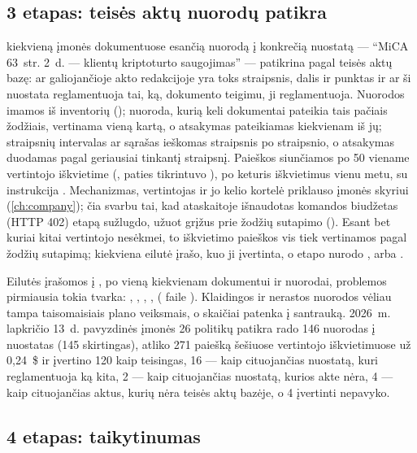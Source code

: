 \subsection{3 etapas: teisės aktų nuorodų patikra}

 kiekvieną įmonės dokumentuose esančią nuorodą į konkrečią nuostatą ---
\enquote{MiCA 63~str. 2~d. --- klientų kriptoturto saugojimas} --- patikrina pagal teisės aktų
bazę: ar galiojančioje akto redakcijoje yra toks straipsnis, dalis ir punktas ir ar ši nuostata
reglamentuoja tai, ką, dokumento teigimu, ji reglamentuoja. Nuorodos imamos iš inventorių
(); nuoroda, kurią keli dokumentai pateikia tais pačiais žodžiais,
vertinama vieną kartą, o atsakymas pateikiamas kiekvienam iš jų; straipsnių intervalas ar
sąrašas ieškomas straipsnis po straipsnio, o atsakymas duodamas pagal geriausiai tinkantį
straipsnį. Paieškos siunčiamos po 50 viename vertintojo iškvietime (,
paties tikrintuvo ), po keturis iškvietimus vienu metu, su instrukcija
. Mechanizmas, vertintojas ir jo kelio kortelė priklauso įmonės
skyriui (\cref{ch:company}); čia svarbu tai, kad ataskaitoje išnaudotas komandos biudžetas (HTTP
402) etapą sužlugdo, užuot grįžus prie žodžių sutapimo (). Esant bet kuriai
kitai vertintojo nesėkmei, to iškvietimo paieškos vis tiek vertinamos pagal žodžių sutapimą;
kiekviena eilutė įrašo, kuo ji įvertinta, o etapo  nurodo ,
 arba .

Eilutės įrašomos į , po vieną kiekvienam dokumentui ir nuorodai,
problemos pirmiausia tokia tvarka: , , ,
,  ( faile ).
Klaidingos ir nerastos nuorodos vėliau tampa taisomaisiais plano veiksmais, o skaičiai patenka į
santrauką. 2026~m. lapkričio 13~d. pavyzdinės įmonės 26 politikų patikra rado 146 nuorodas į
nuostatas (145 skirtingas), atliko 271 paiešką šešiuose vertintojo iškvietimuose už 0,24~\$ ir
įvertino 120 kaip teisingas, 16 --- kaip cituojančias nuostatą, kuri reglamentuoja ką kita, 2 ---
kaip cituojančias nuostatą, kurios akte nėra, 4 --- kaip cituojančias aktus, kurių nėra teisės
aktų bazėje, o 4 įvertinti nepavyko.

\subsection{4 etapas: taikytinumas}\label{sec:report:applicability}

